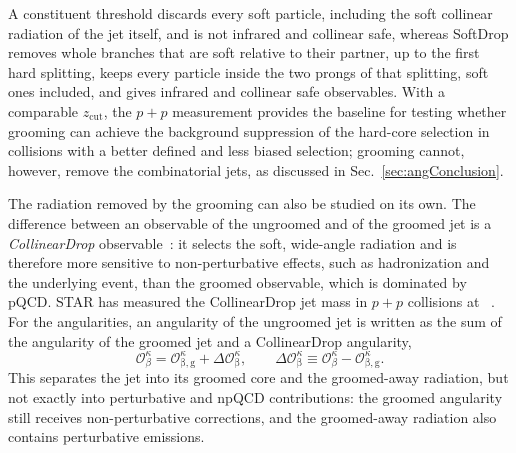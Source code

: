 %
A constituent threshold discards every soft particle, including the soft collinear radiation of the jet itself, and is not infrared and collinear safe, whereas SoftDrop removes whole branches that are soft relative to their partner, up to the first hard splitting, keeps every particle inside the two prongs of that splitting, soft ones included, and gives infrared and collinear safe observables.
%
With a comparable \(z_\mathrm{cut}\), the \(p+p\) measurement provides the baseline for testing whether grooming can achieve the background suppression of the hard-core selection in \AuAu collisions with a better defined and less biased selection; grooming cannot, however, remove the combinatorial jets, as discussed in Sec.~\ref{sec:angConclusion}.

The radiation removed by the grooming can also be studied on its own.
%
The difference between an observable of the ungroomed and of the groomed jet is a \emph{CollinearDrop} observable~\cite{Chien:2019osu}: it selects the soft, wide-angle radiation and is therefore more sensitive to non-perturbative effects, such as hadronization and the underlying event, than the groomed observable, which is dominated by pQCD.
%
STAR has measured the CollinearDrop jet mass in \(p+p\) collisions at ~\cite{song2023measurement}.
%
For the angularities, an angularity of the ungroomed jet is written as the sum of the angularity of the groomed jet and a CollinearDrop angularity,
\begin{equation}
	\mathcal{O}_\beta^\kappa = \mathcal{O}_\mathrm{\beta, g}^\kappa + \Delta\mathcal{O}_\mathrm{\beta}^\kappa , \qquad \Delta\mathcal{O}_\mathrm{\beta}^\kappa \equiv \mathcal{O}_\beta^\kappa - \mathcal{O}_\mathrm{\beta, g}^\kappa .
\end{equation}
%
This separates the jet into its groomed core and the groomed-away radiation, but not exactly into perturbative and npQCD contributions: the groomed angularity still receives non-perturbative corrections, and the groomed-away radiation also contains perturbative emissions.

